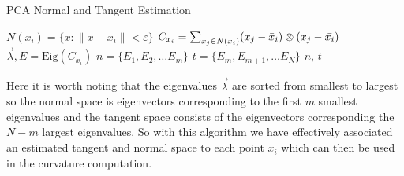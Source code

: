 \documentclass{article}
\begin{document}
\begin{algorithm}
\caption{PCA Normal and Tangent Estimation}\label{alg:pca_normal}
\begin{algorithmic}[1]
\State $N(x_i) = \{x : \|x-x_i\| < \varepsilon\}$
\State $C_{x_i} = \sum_{x_j \in N(x_i)} (x_j - \Bar{x}_i) \otimes (x_j - \Bar{x_i})$ 
\State $\vec{\lambda},E = \text{Eig}(C_{x_i})$ 
\State $n = \{E_1, E_2, \ldots E_m\}$ 
\State $t = \{E_m, E_{m+1}, \ldots E_N\}$ 
\State \Return $n$, $t$
\EndFunction
\end{algorithmic}
\end{algorithm}

Here it is worth noting that the eigenvalues $\vec{\lambda}$ are sorted from smallest to largest so the normal space is eigenvectors corresponding to the first $m$ smallest eigenvalues and the tangent space consists of the eigenvectors corresponding the $N-m$ largest eigenvalues. So with this algorithm we have effectively associated an estimated tangent and normal space to each point $x_i$ which can then be used in the curvature computation.  
\end{document}
